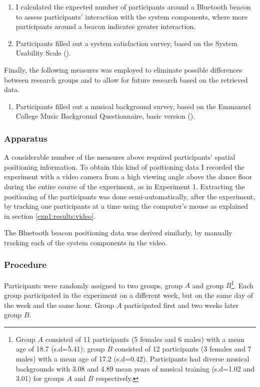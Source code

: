 \documentclass[a4paper,11pt]{article}
\begin{document}
{\begin{enumerate}[resume]
	\item \label{measure:system} I calculated the expected number of participants around a Bluetooth beacon to assess participants' interaction with the system components, where more participants around a beacon indicates greater interaction.
	\item \label{measure:survey:usability} Participants filled out a system satisfaction survey, based on the System Usability Scale (\cite{brooke96}).
\end{enumerate}
Finally, the following measures was employed to eliminate possible differences between research groups and to allow for future research based on the retrieved data.
\begin{enumerate}[resume]
	\item \label{measure:survey:musical} Participants filled out a musical background survey, based on the Emmanuel College Music Background Questionnaire, basic version (\cite{web:zhao12}).
\end{enumerate}

\subsubsection{Apparatus}\label{aparatus}

A considerable number of the measures above required participants' spatial positioning information.
To obtain this kind of positioning data I recorded the experiment with a video camera from a high viewing angle above the dance floor during the entire course of the experiment, as in Experiment 1.
Extracting the positioning of the participants was done semi-automatically, after the experiment, by tracking one participants at a time using the computer's mouse as explained in section \ref{exp1:results:video}.

The Bluetooth beacon positioning data was derived similarly, by manually tracking each of the system components in the video.

\subsubsection{Procedure}

Participants were randomly assigned to two groups, group $A$ and group $B$\@\footnote{Group $A$ consisted of 11 participants (5 females and 6 males) with a mean age of 18.7 (s.d=5.41); group $B$ consisted of 12 participants (3 females and 7 males) with a mean age of 17.2 (s.d=0.42). Participants had diverse musical backgrounds with 3.08 and 4.89 mean years of musical training (s.d=1.02 and 3.01) for groups $A$ and $B$ respectively.}.
Each group participated in the experiment on a different week, but on the same day of the week and the same hour. Group $A$ participated first and two weeks later group $B$.

}
\end{document}
